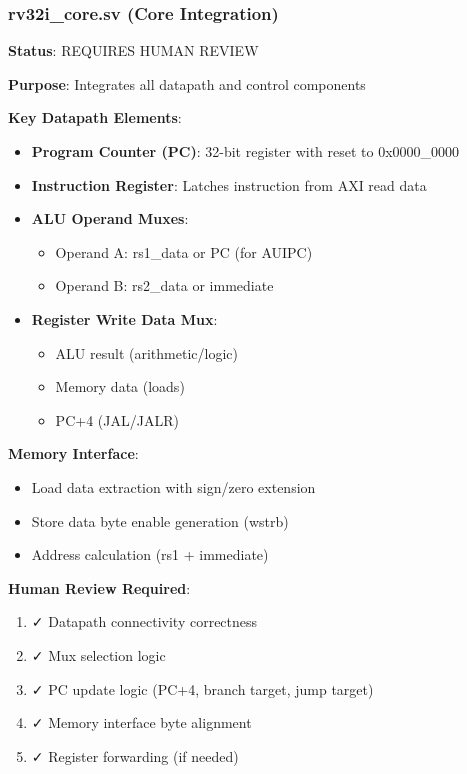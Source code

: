 \subsubsection{\texorpdfstring{rv32i\_\allowbreak{}core.sv (Core
Integration)}{rv32i\_core.sv (Core Integration)}}\label{cr:fix:cpu-integration-summary:rv32i-coresv-core-integration}

\begin{record}

\textbf{Status}: \warn{} REQUIRES HUMAN REVIEW

\textbf{Purpose}: Integrates all datapath and control components

\textbf{Key Datapath Elements}:

\begin{itemize}
\tightlist
\item
  \textbf{Program Counter (PC)}: 32-bit register with reset to
  0x0000\_\allowbreak{}0000
\item
  \textbf{Instruction Register}: Latches instruction from AXI read data
\item
  \textbf{ALU Operand Muxes}:

  \begin{itemize}
  \tightlist
  \item
    Operand A: rs1\_data or PC (for AUIPC)
  \item
    Operand B: rs2\_data or immediate
  \end{itemize}
\item
  \textbf{Register Write Data Mux}:

  \begin{itemize}
  \tightlist
  \item
    ALU result (arithmetic/\allowbreak{}logic)
  \item
    Memory data (loads)
  \item
    PC+4 (JAL/\allowbreak{}JALR)
  \end{itemize}
\end{itemize}

\textbf{Memory Interface}:

\begin{itemize}
\tightlist
\item
  Load data extraction with sign/zero extension
\item
  Store data byte enable generation (wstrb)
\item
  Address calculation (rs1 + immediate)
\end{itemize}

\textbf{Human Review Required}:

\begin{enumerate}
\def\labelenumi{\arabic{enumi}.}
\tightlist
\item
  ✓ Datapath connectivity correctness
\item
  ✓ Mux selection logic
\item
  ✓ PC update logic (PC+4, branch target, jump target)
\item
  ✓ Memory interface byte alignment
\item
  ✓ Register forwarding (if needed)
\end{enumerate}

\end{record}

